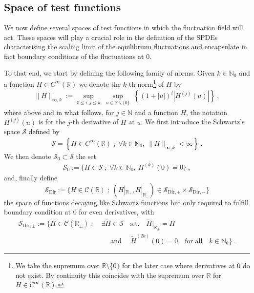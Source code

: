 \documentclass[a4paper, reqno, 12pt]{amsart}
\theoremstyle{plain}
\theoremstyle{definition}
\newcommand{\R}{\mathbb{R}}
\newcommand{\N}{\mathbb{N}}
\newcommand{\Sdir}{\mathcal{S}_{\text{Dir}}}
\begin{document}
\subsection{Space of test functions}
\label{subsec:testfunctionsspace}
We now define several spaces of test functions in which the fluctuation field will act. These spaces will play a crucial role in the definition of the SPDEs characterising the scaling limit of the equilibrium fluctuations and encapsulate in fact boundary conditions of the fluctuations at $0$. 

To that end, we start by defining the following family of norms. Given $k\in\N_0$ and a function $H\in C^{\infty}(\R)$ we denote the $k$-th norm{\footnote{We take the supremum over $\R\setminus\{0\}$ for the later case where derivatives at 0 do not exist. By continuity this coincides with the supremum over $\R$ for $H\in C^{\infty}(\R)$.}}
of $H$ by
\begin{align*}
    \|H\|_{\infty,k} := \sup_{0\leq i,j\leq k} \;  \sup_{u\in\R \backslash\{ 0\}} \;  \left\{  (1+|u|)^i|H^{(j)}(u)| \right\} \ ,
\end{align*}
where above and in what follows, for $j\in\mathbb N$ and a function $H$, the notation $H^{(j)}(u)$ is for the $j$-th derivative of $H$ at $u$. 
We first introduce the Schwartz's space $\mathcal{S}$ defined by 
\begin{align*}
    \mathcal{S} = \left\{H\in C^{\infty}(\R)\; ; \; \forall k\in\N_0, \ \|H\|_{\infty,k}<\infty \right\} \ .
\end{align*}
We then denote $ \mathcal{S}_0 \subset  \mathcal{S}$ the set
\begin{align*}
    \mathcal{S}_0 := \{H\in\mathcal{S}\; ; \; \forall k \in \mathbb N_0, \ H^{(k)}(0) = 0 \} \ ,
\end{align*}
and, finally define
\begin{equation}
    \Sdir  := \{H\in \mathcal C(\R) \; ; \;  (H|_{\R_+},H|_{\R_-})\in\mathcal{S}_{\text{Dir},+}  \times \mathcal{S}_{\text{Dir},-}  \}
\end{equation}
the space of functions decaying like Schwartz functions but only required to fulfill boundary condition at $0$ for even derivatives, with 
\begin{equation*}
\begin{split}
    \mathcal{S}_{\text{Dir},\pm}  := \big\{H\in \mathcal C(\R_\pm) \; ; \; &\exists\tilde{H}\in\mathcal S\quad \textrm{s.t.} \quad  \tilde{H}|_{\R_\pm} = H   \\
    &  \quad \text{ and } \quad  \tilde H^{(2k)}(0) = 0 \quad  \text{for all} \quad  k\in\N_0 \big\}\ .
\end{split}
\end{equation*}
\end{document}
